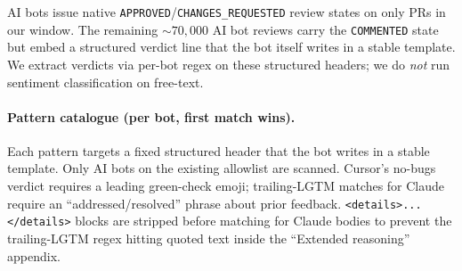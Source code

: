 
AI bots issue native \texttt{APPROVED}/\texttt{CHANGES\_REQUESTED} review states on only \PLACEHOLDERAIOPRSNATIVE{} PRs in our window. The remaining ${\sim}70{,}000$ AI bot reviews carry the \texttt{COMMENTED} state but embed a structured verdict line that the bot itself writes in a stable template. We extract verdicts via per-bot regex on these structured headers; we do \emph{not} run sentiment classification on free-text.

\paragraph{Pattern catalogue (per bot, first match wins).} Each pattern targets a fixed structured header that the bot writes in a stable template. Only AI bots on the existing allowlist are scanned. Cursor's no-bugs verdict requires a leading green-check emoji; trailing-LGTM matches for Claude require an ``addressed/resolved'' phrase about prior feedback. \texttt{<details>...</details>} blocks are stripped before matching for Claude bodies to prevent the trailing-LGTM regex hitting quoted text inside the ``Extended reasoning'' appendix.

